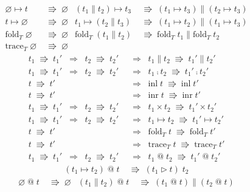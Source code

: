 \documentclass[a4j, dvipdfmx]{jsarticle}
\theoremstyle{definition}
\newcommand{\reduct}[2]{#1 &\;\Rrightarrow\; #2}
\newcommand{\reduction}[2]{#1 \;\Rrightarrow\; #2}
\begin{document}
\begin{figure}[H]
\begin{align*}
    \reduct{\varnothing\mapsto{}t}{\varnothing} &
    \reduct{(t_1\parallel{}t_2)\mapsto{}t_3}{(t_1\mapsto{}t_3)\parallel(t_2\mapsto{}t_3)} \\
    \reduct{t\mapsto\varnothing}{\varnothing} &
    \reduct{t_1\mapsto(t_2\parallel{}t_3)}{(t_1\mapsto{}t_2)\parallel(t_1\mapsto{}t_3)} \\
    \reduct{\text{fold}_T\;\varnothing}{\varnothing} &
    \reduct{\text{fold}_T\;(t_1\parallel{}t_2)}{\text{fold}_T\;t_1\parallel\text{fold}_T\;t_2} \\
    \reduct{\text{trace}_T\;\varnothing}{\varnothing}
  \end{align*}
  \begin{align*}
    \reduction{t_1}{t_1'} \;\;\Longrightarrow\;\; \reduction{t_2}{t_2'} &\;\;\Longrightarrow\;\; \reduction{t_1\parallel{}t_2}{t_1'\parallel{}t_2'} \\
    \reduction{t_1}{t_1'} \;\;\Longrightarrow\;\; \reduction{t_2}{t_2'} &\;\;\Longrightarrow\;\; \reduction{t_1\fcmp{}t_2}{t_1'\fcmp{}t_2'} \\
    \reduction{t}{t'} &\;\;\Longrightarrow\;\; \reduction{\text{inl}\;t}{\text{inl}\;t'} \\
    \reduction{t}{t'} &\;\;\Longrightarrow\;\; \reduction{\text{inr}\;t}{\text{inr}\;t'} \\
    \reduction{t_1}{t_1'} \;\;\Longrightarrow\;\; \reduction{t_2}{t_2'} &\;\;\Longrightarrow\;\; \reduction{t_1\times{}t_2}{t_1'\times{}t_2'} \\
    \reduction{t_1}{t_1'} \;\;\Longrightarrow\;\; \reduction{t_2}{t_2'} &\;\;\Longrightarrow\;\; \reduction{t_1\mapsto{}t_2}{t_1'\mapsto{}t_2'} \\
    \reduction{t}{t'} &\;\;\Longrightarrow\;\; \reduction{\text{fold}_T\;t}{\text{fold}_T\;t'} \\
    \reduction{t}{t'} &\;\;\Longrightarrow\;\; \reduction{\text{trace}_T\;t}{\text{trace}_T\;t'} \\
    \reduction{t_1}{t_1'} \;\;\Longrightarrow\;\; \reduction{t_2}{t_2'} &\;\;\Longrightarrow\;\; \reduction{t_1\;\text{@}\;t_2}{t_1'\;\text{@}\;t_2'}
  \end{align*}
  \begin{align*}
    \reduct{(t_1\mapsto{}t_2)\;\text{@}\;t}{(t_1\triangleright{}t)\;t_2}
  \end{align*}
  \begin{align*}
    \reduct{\varnothing\;\text{@}\;t}{\varnothing} &
    \reduct{(t_1\parallel{}t_2)\;\text{@}\;t}{(t_1\;\text{@}\;t)\parallel(t_2\;\text{@}\;t)} \\

\end{align*}
\end{figure}
\end{document}
